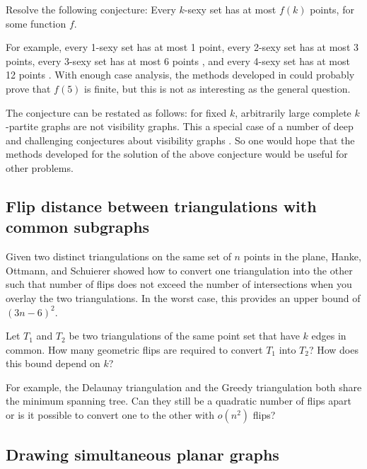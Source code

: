 \documentclass{patmorin}
\newcommand{\poser}[1]{\noindent{\textit{#1}}}
\begin{document}
\begin{op}
  Resolve the following conjecture: Every $k$-sexy set has at most $f(k)$
  points, for some function $f$.
\end{op}

For example, every 1-sexy  set has at most 1 point, every 2-sexy set
has at most 3 points, every 3-sexy set has at most 6 points \cite{Kara},
and every 4-sexy set has at most 12 points \cite{Aloupis}. With enough
case analysis, the methods developed in \cite{Aloupis} could probably
prove that $f(5)$ is finite, but this is not as interesting as the
general question.

The conjecture can be restated as follows:  for fixed $k$,  arbitrarily
large complete $k$-partite graphs are not visibility graphs. This a
special case of a number of deep and challenging conjectures about
visibility graphs \cite{Kara,Por}. So one would hope that the methods
developed for the solution of the above conjecture would be useful for
other problems.

\subsection{Flip distance between triangulations with common subgraphs}

\poser{Jit Bose}

Given two distinct triangulations on the same set of $n$ points in the
plane, Hanke, Ottmann, and Schuierer showed how to convert one
triangulation into the other such that number of flips does not exceed
the number of intersections when you overlay the two triangulations.
In the worst case, this provides an upper bound of $(3n-6)^2$.

\begin{op}
  Let $T_1$ and $T_2$ be two triangulations of the same point set that
  have $k$ edges in common.  How many geometric flips are required to
  convert $T_1$ into $T_2$?  How does this bound depend on $k$?
\end{op}

For example, the Delaunay triangulation and the Greedy triangulation both
share the minimum spanning tree. Can they still be a quadratic number of
flips apart or is it possible to convert one to the other with $o(n^2)$
flips?


\subsection{Drawing simultaneous planar graphs}
\end{document}
